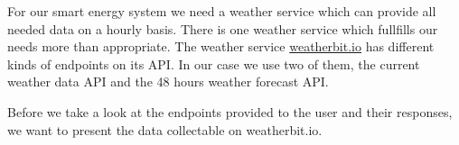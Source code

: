 For our smart energy system we need a weather service which can provide all needed data on a hourly basis.
There is one weather service which fullfills our needs more than appropriate.
The weather service \url{weatherbit.io} has different kinds of endpoints on its API.
In our case we use two of them, the current weather data API and the 48 hours weather forecast API.

Before we take a look at the endpoints provided to the user and their responses, we want to present the data collectable on weatherbit.io.